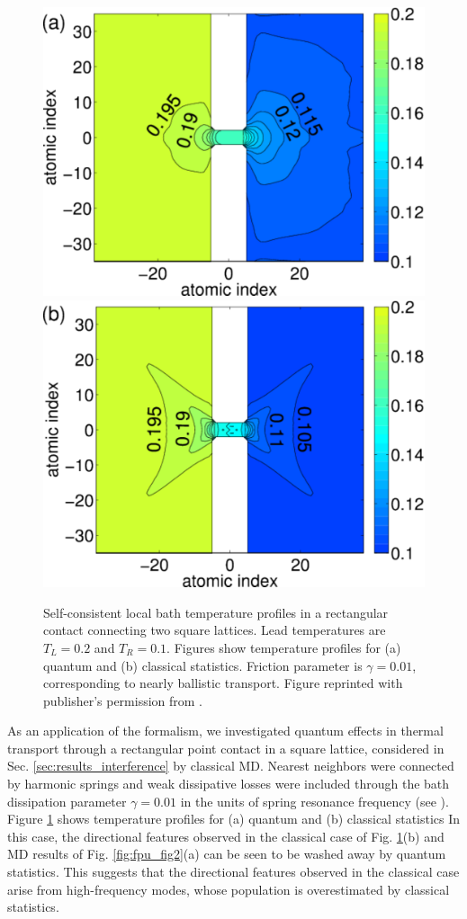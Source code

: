 \begin{figure}
 \includegraphics[width=.49\columnwidth]{pics/gf_fig7a.pdf}
 \includegraphics[width=.49\columnwidth]{pics/gf_fig7b.pdf}
 \caption{Self-consistent local bath temperature profiles in a rectangular contact connecting two square lattices. Lead temperatures are $T_L=0.2$ and $T_R=0.1$. Figures show temperature profiles for (a) quantum and (b) classical statistics. Friction parameter is $\gamma=0.01$, corresponding to nearly ballistic transport. Figure reprinted with publisher's permission from .}
 \label{fig:gf_fig7}
\end{figure}

As an application of the formalism, we investigated quantum effects in thermal transport through a rectangular point contact in a square lattice, considered in Sec. \ref{sec:results_interference} by classical MD. Nearest neighbors were connected by harmonic springs and weak dissipative losses were included through the bath dissipation parameter $\gamma=0.01$ in the units of spring resonance frequency (see ). Figure \ref{fig:gf_fig7} shows temperature profiles for (a) quantum and (b) classical statistics   In this case, the directional features observed in the classical case of Fig. \ref{fig:gf_fig7}(b) and MD results of Fig. \ref{fig:fpu_fig2}(a) can be seen to be washed away by quantum statistics. This suggests that the directional features observed in the classical case arise from high-frequency modes, whose population is overestimated by classical statistics.

